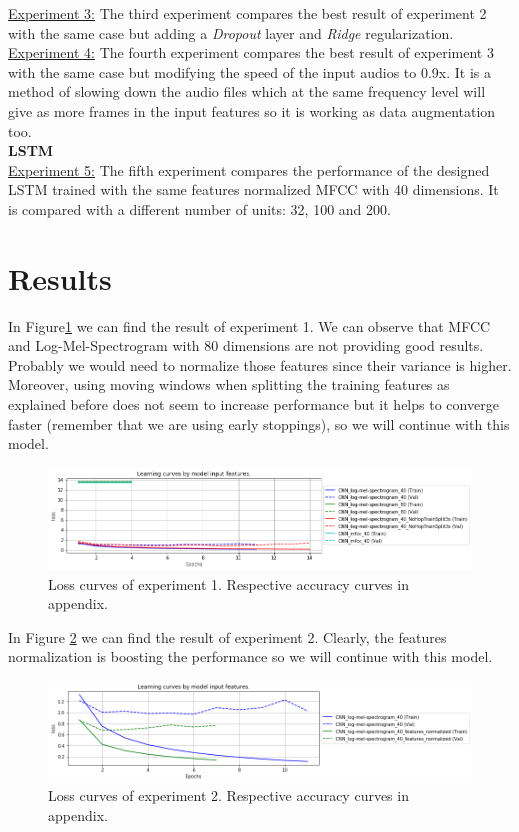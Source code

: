 \documentclass[12pt]{extarticle}
\begin{document}
\noindent \underline{Experiment 3:} The third experiment compares the best result of experiment 2 with the same case but adding a \textit{Dropout} layer and \textit{Ridge} regularization.\\

\noindent \underline{Experiment 4:} The fourth experiment compares the best result of experiment 3 with the same case but modifying the speed of the input audios to 0.9x. It is a method of slowing down the audio files which at the same frequency level will give as more frames in the input features so it is working as data augmentation too.\\

\noindent \textbf{LSTM}\\

\noindent \underline{Experiment 5:} The fifth experiment compares the performance of the designed LSTM trained with the same features normalized MFCC with 40 dimensions. It is compared with a different number of units: 32, 100 and 200.

\section{Results}

In Figure\ref{fig6} we can find the result of experiment 1. We can observe that MFCC and Log-Mel-Spectrogram with 80 dimensions are not providing good results. Probably we would need to normalize those features since their variance is higher. Moreover, using moving windows when splitting the training features as explained before does not seem to increase performance but it helps to converge faster (remember that we are using early stoppings), so we will continue with this model.

\begin{figure}[h]
\centering
\includegraphics[width=\linewidth]{Figures/5.png}
\caption{Loss curves of experiment 1. Respective accuracy curves in appendix.}
\label{fig6}
\end{figure}

\newpage

\noindent In Figure \ref{fig7} we can find the result of experiment 2. Clearly, the features normalization is boosting the performance so we will continue with this model.
\begin{figure}[h]
\centering
\includegraphics[width=\linewidth]{Figures/6.png}
\caption{Loss curves of experiment 2. Respective accuracy curves in appendix.}
\label{fig7}
\end{figure}
\end{document}
